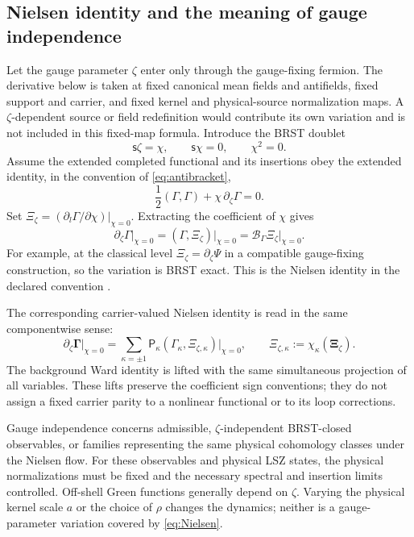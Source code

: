 \documentclass[final,5p,times,twocolumn,numbers,nopreprintline]{elsarticle}
\numberwithin{equation}{section}
\theoremstyle{definition}
\theoremstyle{remark}
\newcommand{\BR}{\mathsf s}
\newcommand{\vct}[1]{\boldsymbol{#1}}
\begin{document}
\subsection{Nielsen identity and the meaning of gauge independence}
\label{sec:Nielsen}

Let the gauge parameter \(\zeta\) enter only through the
gauge-fixing fermion. The derivative below is taken at fixed
canonical mean fields and antifields, fixed support and carrier,
and fixed kernel and physical-source normalization maps. A
\(\zeta\)-dependent source or field redefinition would contribute
its own variation and is not included in this fixed-map formula.
Introduce the BRST doublet
\[
 \BR\zeta=\chi,\qquad \BR\chi=0,\qquad\chi^2=0.
\]
Assume the extended completed functional and its insertions obey
the extended identity, in the convention of
\eqref{eq:antibracket},
\begin{equation}
 \frac12(\Gamma,\Gamma)+\chi\,\partial_\zeta\Gamma=0.
 \label{eq:extended-ST}
\end{equation}
Set
\(\Xi_\zeta=(\partial_l\Gamma/\partial\chi)|_{\chi=0}\).
Extracting the coefficient of \(\chi\) gives
\begin{equation}
 \partial_\zeta\Gamma\big|_{\chi=0}
       =(\Gamma,\Xi_\zeta)\big|_{\chi=0}
       =\mathcal B_\Gamma\Xi_\zeta\big|_{\chi=0}.
 \label{eq:Nielsen}
\end{equation}
For example, at the classical level
\(\Xi_\zeta=\partial_\zeta\Psi\) in a compatible gauge-fixing
construction, so the variation is BRST exact.
This is the Nielsen identity in the declared convention
\cite{Nielsen1975}.

The corresponding carrier-valued Nielsen identity is read in the
same componentwise sense:
\begin{equation}
 \partial_\zeta\vct\Gamma\big|_{\chi=0}
  =\sum_{\kappa=\pm1}\mathsf P_\kappa
       (\Gamma_{\kappa},\Xi_{\zeta,\kappa})\big|_{\chi=0},
 \qquad
 \Xi_{\zeta,\kappa}
  :=\chi_\kappa(\vct\Xi_\zeta).
 \label{eq:carrier-Nielsen}
\end{equation}
The background Ward identity is lifted with the same simultaneous
projection of all variables. These lifts preserve the coefficient
sign conventions; they do not assign a fixed carrier parity to a
nonlinear functional or to its loop corrections.

Gauge independence concerns admissible, \(\zeta\)-independent
BRST-closed observables, or families representing the same physical
cohomology classes under the Nielsen flow. For these observables and
physical LSZ states, the physical normalizations must be fixed and
the necessary spectral and insertion limits controlled. Off-shell
Green functions generally depend on \(\zeta\).
Varying the physical kernel scale \(a\) or the choice of \(\rho\)
changes the dynamics; neither is a gauge-parameter variation
covered by \eqref{eq:Nielsen}.
\end{document}
